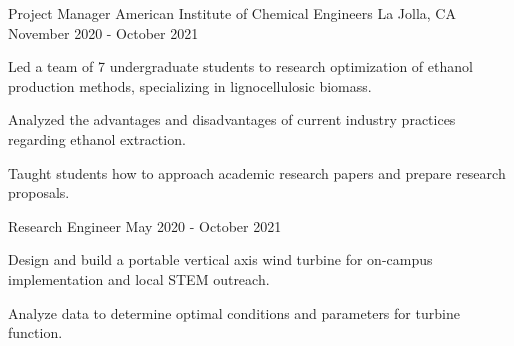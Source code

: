 \begin{cventries}
\cventrytwo
{Project Manager} %
{American Institute of Chemical Engineers} %
{La Jolla, CA} %
{November 2020 - October 2021} %
{
  \begin{cvitems} %
    \item {Led a team of 7 undergraduate students to research optimization of ethanol production methods, specializing in lignocellulosic biomass.}
    \item {Analyzed the advantages and disadvantages of current industry practices regarding ethanol extraction.}
    \item {Taught students how to approach academic research papers and prepare research proposals.}
  \end{cvitems}
}
    {Research Engineer} %
    {May 2020 - October 2021} %
    {
        \begin{cvitems} %
            \item {Design and build a portable vertical axis wind turbine for on-campus implementation and local STEM outreach.}
            \item {Analyze data to determine optimal conditions and parameters for turbine function.}
        \end{cvitems}
    }

\end{cventries}
